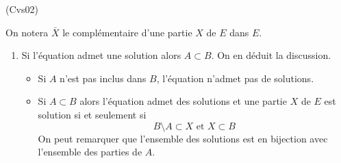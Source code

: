 \begin{tiny}(Cvs02)\end{tiny}
On notera $\bar{X}$ le complémentaire d'une partie $X$ de $E$ dans $E$.
\begin{enumerate}
 \item Si l'équation admet une solution alors $A\subset B$. On en déduit la discussion.
\begin{itemize}
 \item Si $A$ n'est pas inclus dans $B$, l'équation n'admet pas de solutions.
 \item Si $A\subset B$ alors l'équation admet des solutions et une partie $X$ de $E$ est solution si et seulement si 
\begin{displaymath}
B\setminus A \subset X \text{ et } X\subset B 
\end{displaymath}
On peut remarquer que l'ensemble des solutions est en bijection avec l'ensemble des parties de $A$. 
\end{itemize}
 

\end{enumerate}
